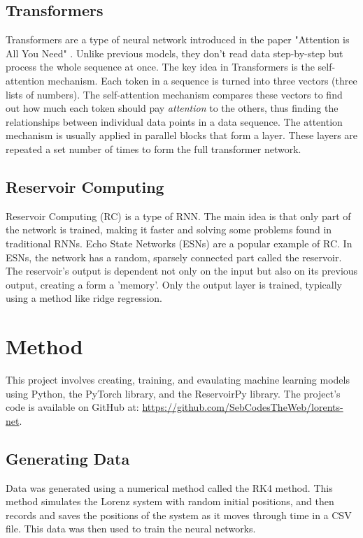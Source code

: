 \documentclass[11pt]{article}
\begin{document}
\subsection{Transformers}
Transformers are a type of neural network introduced in the paper "Attention is All You Need" \cite{DBLP:journals/corr/VaswaniSPUJGKP17}. Unlike previous models, they don't read data step-by-step but process the whole sequence at once. The key idea in Transformers is the self-attention mechanism. Each token in a sequence is turned into three vectors (three lists of numbers). The self-attention mechanism compares these vectors to find out how much each token should pay \emph{attention} to the others, thus finding the relationships between individual data points in a data sequence. The attention mechanism is usually applied in parallel blocks that form a layer. These layers are repeated a set number of times to form the full transformer network. 

\subsection{Reservoir Computing}
Reservoir Computing (RC) is a type of RNN. The main idea is that only part of the network is trained, making it faster and solving some problems found in traditional RNNs. Echo State Networks (ESNs) are a popular example of RC. In ESNs, the network has a random, sparsely connected part called the reservoir. The reservoir's output is dependent not only on the input but also on its previous output, creating a form a 'memory'. Only the output layer is trained, typically using a method like ridge regression.


\section{Method}
This project involves creating, training, and evaulating machine learning models using Python, the PyTorch library, and the ReservoirPy library. The project's code is available on GitHub at: \url{https://github.com/SebCodesTheWeb/lorents-net}.

\subsection{Generating Data}

Data was generated using a numerical method called the RK4 method. This method simulates the Lorenz system with random initial positions, and then records and saves the positions of the system as it moves through time in a CSV file. This data was then used to train the neural networks.
\end{document}
